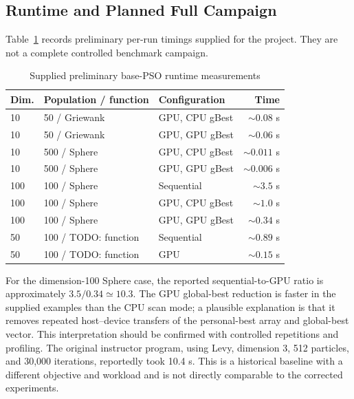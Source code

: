 \documentclass[conference]{IEEEtran}
\begin{document}
\subsection{Runtime and Planned Full Campaign}
\label{sec:campaign}
Table~\ref{tab:timings} records preliminary per-run timings supplied for the
project. They are not a complete controlled benchmark campaign.
\begin{table}[t]
\centering
\caption{Supplied preliminary base-PSO runtime measurements}
\label{tab:timings}
\begin{tabular}{lllr}
\toprule
\textbf{Dim.} & \textbf{Population / function} &
\textbf{Configuration} & \textbf{Time}\\
\midrule
10 & 50 / Griewank & GPU, CPU gBest & $\sim0.08$ s\\
10 & 50 / Griewank & GPU, GPU gBest & $\sim0.06$ s\\
10 & 500 / Sphere & GPU, CPU gBest & $\sim0.011$ s\\
10 & 500 / Sphere & GPU, GPU gBest & $\sim0.006$ s\\
100 & 100 / Sphere & Sequential & $\sim3.5$ s\\
100 & 100 / Sphere & GPU, CPU gBest & $\sim1.0$ s\\
100 & 100 / Sphere & GPU, GPU gBest & $\sim0.34$ s\\
50 & 100 / TODO: function & Sequential & $\sim0.89$ s\\
50 & 100 / TODO: function & GPU & $\sim0.15$ s\\
\bottomrule
\end{tabular}
\end{table}
For the dimension-100 Sphere case, the reported sequential-to-GPU ratio is
approximately $3.5/0.34\simeq10.3$. The GPU global-best reduction is faster
in the supplied examples than the CPU scan mode; a plausible explanation is
that it removes repeated host--device transfers of the personal-best array
and global-best vector. This interpretation should be confirmed with
controlled repetitions and profiling. The original instructor program,
using Levy, dimension 3, 512 particles, and 30,000 iterations, reportedly
took 10.4 s. This is a historical baseline with a different objective and
workload and is not directly comparable to the corrected experiments.
\end{document}
